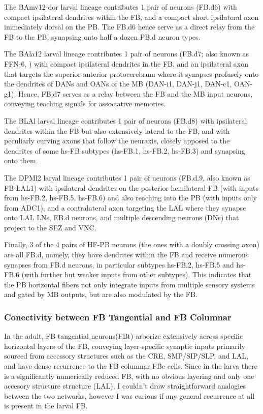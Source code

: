             The BAmv12-dor larval lineage contributes 1 pair of neurons (FB.d6) with compact ipsilateral dendrites within the FB, and a compact short ipsilateral axon immediately dorsal on the PB. The FB.d6 hence serve as a direct relay from the FB to the PB, synapsing onto half a dozen PB.d neuron types.

            The BAla12 larval lineage contributes 1 pair of neurons (FB.d7; also known as FFN-6, \citep{eschbach2021circuits}) with compact ipsilateral dendrites in the FB, and an ipsilateral axon that targets the superior anterior protocerebrum where it synapses profusely onto the dendrites of DANs and OANs of the MB (DAN-i1, DAN-j1, DAN-c1, OAN-g1). Hence, FB.d7 serves as a relay between the FB and the MB input neurons, conveying teaching signals for associative memories.

            The BLAl larval lineage contributes 1 pair of neurons (FB.d8) with ipsilateral dendrites within the FB but also extensively lateral to the FB, and with peculiarly curving axons that follow the neuraxis, closely apposed to the dendrites of some hs-FB subtypes (hs-FB.1, hs-FB.2, hs-FB.3) and synapsing onto them.

            The DPMl2 larval lineage contributes 1 pair of neurons (FB.d.9, also known as FB-LAL1) with ipsilateral dendrites on the posterior  hemilateral FB (with inputs from hs-FB.2, hs-FB.5, hs-FB.6) and also reaching into the PB (with inputs only from ADC1), and a contralateral axon targeting the LAL where they synapse onto LAL LNs, EB.d neurons, and multiple descending neurons (DNs) that project to the SEZ and VNC.

            Finally, 3 of the 4 pairs of HF-PB neurons (the ones with a doubly crossing axon) are all FB.d, namely, they have dendrites within the FB and receive numerous synapses from FB.d neurons, in particular subtypes hs-FB.2, hs-FB.5 and hs-FB.6 (with further but weaker inputs from other subtypes). This indicates that the PB horizontal fibers not only integrate inputs from multiple sensory systems and gated by MB outputs, but are also modulated by the FB.

        \subsubsection{Conectivity between FB Tangential and FB Columnar}
           In the adult, FB tangential neurons(FBt) arborize extensively across specific horizontal layers of the FB, conveying layer-specific synaptic inputs primarily sourced from accessory structures such as the CRE, SMP/SIP/SLP, and LAL, and have dense recurrence to the FB columnar FBc cells. Since in the larva there is a significantly numerically reduced FB, with no obvious layering and only one accesory structure structure (LAL), I couldn't draw straightforward analogies between the two networks, however I was curious if any general recurrence at all is present in the larval FB.  
           
